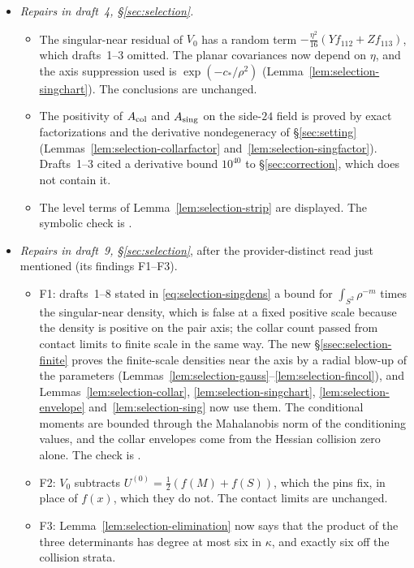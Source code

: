 \begin{itemize}[leftmargin=1.5em,itemsep=2pt]
\item \emph{Repairs in draft~4, \S\ref{sec:selection}.}
  \begin{itemize}[leftmargin=1.2em,itemsep=1pt]
  \item The singular-near residual of $V_0$ has a random term $-\frac{\eta^2}{16}(Yf_{112}+Zf_{113})$, which drafts~1--3 omitted. The planar covariances now depend on $\eta$, and the axis suppression used is $\exp(-c_*/\rho^2)$ (Lemma~\ref{lem:selection-singchart}). The conclusions are unchanged.
  \item The positivity of $A_{\rm col}$ and $A_{\rm sing}$ on the side-$24$ field is proved by exact factorizations and the derivative nondegeneracy of \S\ref{sec:setting} (Lemmas~\ref{lem:selection-collarfactor} and~\ref{lem:selection-singfactor}). Drafts~1--3 cited a derivative bound $10^{40}$ to \S\ref{sec:correction}, which does not contain it.
  \item The level terms of Lemma~\ref{lem:selection-strip} are displayed. The symbolic check is .
  \end{itemize}
\item \emph{Repairs in draft~9, \S\ref{sec:selection}}, after the provider-distinct read just mentioned (its findings F1--F3).
  \begin{itemize}[leftmargin=1.2em,itemsep=1pt]
  \item F1: drafts~1--8 stated in \eqref{eq:selection-singdens} a bound for $\int_{S^2}\rho^{-m}$ times the singular-near density, which is false at a fixed positive scale because the density is positive on the pair axis; the collar count passed from contact limits to finite scale in the same way. The new \S\ref{ssec:selection-finite} proves the finite-scale densities near the axis by a radial blow-up of the parameters (Lemmas~\ref{lem:selection-gauss}--\ref{lem:selection-fincol}), and Lemmas~\ref{lem:selection-collar}, \ref{lem:selection-singchart}, \ref{lem:selection-envelope} and~\ref{lem:selection-sing} now use them. The conditional moments are bounded through the Mahalanobis norm of the conditioning values, and the collar envelopes come from the Hessian collision zero alone. The check is .
  \item F2: $V_0$ subtracts $U^{(0)}=\frac12(f(M)+f(S))$, which the pins fix, in place of $f(x)$, which they do not. The contact limits are unchanged.
  \item F3: Lemma~\ref{lem:selection-elimination} now says that the product of the three determinants has degree at most six in $\kappa$, and exactly six off the collision strata.

\end{itemize}
\end{itemize}
